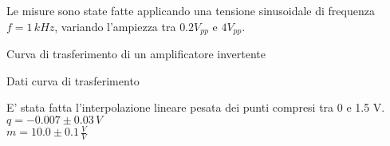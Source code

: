 Le misure sono state fatte applicando una tensione sinusoidale di frequenza $ f=1 \,kHz$, variando l'ampiezza tra 
$0.2 V_{pp}$ e $4 V_{pp}$.

\begin{grafico} 
 \centering 
  
 \caption{Curva di trasferimento di un amplificatore invertente} 
 \label{gr:amp_noninv.tex} 
\end{grafico}

\begin{tabella}
 \centering
  
 \caption{Dati curva di trasferimento}
 \label{tab:tab_non_inv.tex}
\end{tabella}

E' stata fatta l'interpolazione lineare pesata dei punti compresi tra 0 e 1.5 V.\\
$q = -0.007 \pm 0.03 \, V$\\
$m = 10.0 \pm 0.1 \,\frac{V}{V}$

